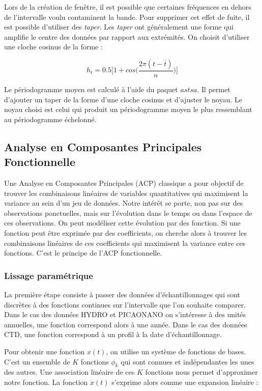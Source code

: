 \documentclass[12pt]{article}
\begin{document}
Lors de la création de fenêtre, il est possible que certaines fréquences en dehors de l'intervalle voulu contaminent la bande. Pour supprimer cet effet de fuite, il est possible d'utiliser des \textit{taper}. Les \textit{taper} ont généralement une forme qui amplifie le centre des données par rapport aux extrémités. On choisit d’utiliser une cloche cosinus de la forme : 

\[h_t=0.5\bigg[1 + cos\bigg(\frac{2\pi(t- \bar t)}{n}\bigg)\bigg]\]

Le périodogramme moyen est calculé à l’aide du paquet $astsa$. Il permet d’ajouter un taper de la forme d’une cloche cosinus et d’ajuster le noyau. Le noyau choisi est celui qui produit un périodogramme moyen le plus ressemblant au périodogramme échelonné. 


\subsection{Analyse en Composantes Principales Fonctionnelle}

Une Analyse en Composantes Principales (ACP) classique a pour objectif de trouver les combinaisons linéaires de variables quantitatives qui maximisent la variance au sein d’un jeu de données. Notre intérêt se porte, non pas sur des observations ponctuelles, mais sur l’évolution dans le temps ou dans l’espace de ces observations. On peut modéliser cette évolution par des fonction. Si une fonction peut être exprimée par des coefficients, on cherche alors à trouver les combinaisons linéaires de ces coefficients qui maximisent la variance entre ces fonctions. C’est le principe de l’ACP fonctionnelle. 

\subsubsection{Lissage paramétrique}

La première étape consiste à passer des données d’échantillonnages qui sont discrètes à des fonctions continues sur l’intervalle que l’on souhaite comparer. Dans le cas des données HYDRO et PICAONANO on s’intéresse à des unités annuelles, une fonction correspond alors à une année. Dans le cas des données CTD, une fonction correspond à un profil à la date d’échantillonnage.   

Pour obtenir une fonction $x(t)$, on utilise un système de fonctions de bases. C'est un ensemble de $K$ fonctions $\phi_k$ qui sont connues et indépendantes les unes des autres. Une association linéaire de ces $K$ fonctions nous permet d'approximer notre fonction. La fonction $x(t)$ s'exprime alors comme une expansion linéaire : 
\end{document}
